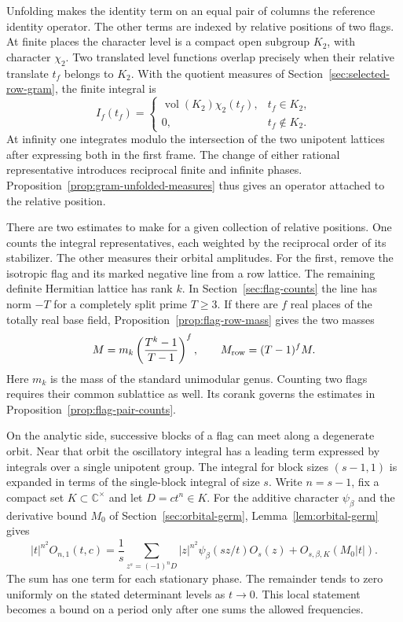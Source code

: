 Unfolding makes the identity term on an equal pair of columns the reference identity operator. The other terms are indexed by relative positions of two flags. At finite places the character level is a compact open subgroup \(K_2\), with character \(\chi_2\). Two translated level functions overlap precisely when their relative translate \(t_f\) belongs to \(K_2\). With the quotient measures of Section~\ref{sec:selected-row-gram}, the finite integral is
\[
 I_f(t_f)=
 \begin{cases}
  \operatorname{vol}(K_2)\chi_2(t_f), & t_f\in K_2,\\
  0, & t_f\notin K_2.
 \end{cases}
\] At infinity one integrates modulo the intersection of the two unipotent lattices after expressing both in the first frame. The change of either rational representative introduces reciprocal finite and infinite phases. Proposition~\ref{prop:gram-unfolded-measures} thus gives an operator attached to the relative position.

There are two estimates to make for a given collection of relative positions. One counts the integral representatives, each weighted by the reciprocal order of its stabilizer. The other measures their orbital amplitudes. For the first, remove the isotropic flag and its marked negative line from a row lattice. The remaining definite Hermitian lattice has rank \(k\). In Section~\ref{sec:flag-counts} the line has norm \(-T\) for a completely split prime \(T\ge3\). If there are \(f\) real places of the totally real base field, Proposition~\ref{prop:flag-row-mass} gives the two masses
\[
 M=m_k\left(\frac{T^k-1}{T-1}\right)^f,\qquad
 M_{\rm row}=(T-1)^fM .
\]
Here \(m_k\) is the mass of the standard unimodular genus. Counting two flags requires their common sublattice as well. Its corank governs the estimates in Proposition~\ref{prop:flag-pair-counts}.

On the analytic side, successive blocks of a flag can meet along a degenerate orbit. Near that orbit the oscillatory integral has a leading term expressed by integrals over a single unipotent group. The integral for block sizes \((s-1,1)\) is expanded in terms of the single-block integral of size \(s\). Write \(n=s-1\), fix a compact set \(K\subset\mathbb C^\times\) and let \(D=ct^n\in K\). For the additive character \(\psi_\beta\) and the derivative bound \(M_0\) of Section~\ref{sec:orbital-germ}, Lemma~\ref{lem:orbital-germ} gives
\[
 |t|^{n^2}O_{n,1}(t,c)
  =\frac1s\sum_{z^s=(-1)^nD}|z|^{n^2}\psi_\beta(sz/t)O_s(z)
      +O_{s,\beta,K}(M_0|t|).
\]
The sum has one term for each stationary phase. The remainder tends to zero uniformly on the stated determinant levels as \(t\to0\). This local statement becomes a bound on a period only after one sums the allowed frequencies.

